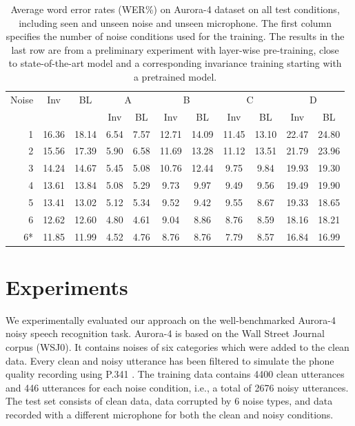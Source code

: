 \documentclass[a4paper]{article}
\begin{document}
\begin{table}[t]
    \centering
    \caption{Average word error rates (WER\%) on Aurora-4 dataset on all test conditions,
        including seen and unseen noise and unseen microphone. The first column
        specifies the number of noise conditions used for the training. The
        results in the last row are from a preliminary experiment with
        layer-wise pre-training, close to state-of-the-art
        model and a corresponding invariance training starting with a pretrained model.}
    \label{tab:results}
    \begin{tabular}{r|cc||cc|cc|cc|cc}
        Noise       &Inv&BL&  \multicolumn{2}{c|}{A} & \multicolumn{2}{c|}{B} & \multicolumn{2}{c|}{C} & \multicolumn{2}{c}{D}\\
               & & &  Inv & BL & Inv & BL & Inv & BL & Inv & BL\\
    \hline
    1           &16.36        &18.14 &6.54&7.57    &12.71& 14.09   & 11.45&   13.10    & 22.47 &   24.80    \\
    2           &15.56        &17.39 &5.90&  6.58 &   11.69   &13.28   &11.12   &13.51   &21.79   &23.96 \\
    3           &14.24        &14.67 &5.45 & 5.08&    10.76&   12.44&   9.75&    9.84 &   19.93&   19.30\\
    4           &13.61        &13.84 & 5.08 &5.29    &9.73    &9.97    &9.49    &9.56    &19.49   &19.90\\         
    5           &13.41        &13.02 & 5.12 &5.34    &9.52    &9.42    &9.55    &8.67    &19.33   &18.65\\         
    6           &12.62        &12.60 & 4.80 &4.61    &9.04    &8.86    &8.76    &8.59    &18.16   &18.21\\
    \hline\hline
    6* &11.85        &11.99    &4.52    &4.76    &8.76    &8.76    &7.79    &8.57    &16.84&    16.99
    \end{tabular}
\end{table}

\section{Experiments}
\label{sec:experiments}
We experimentally evaluated our approach   
on the well-benchmarked Aurora-4 \citep{parihar2002aurora} noisy speech recognition task. Aurora-4
is based on the Wall Street Journal corpus (WSJ0). It contains noises of 
six categories which were added to the clean data. Every clean and noisy
utterance has been 
filtered to simulate the phone quality recording using P.341 \citep{pariharsignal}. The training
data contains 4400 clean utterances and 446 utterances for each noise condition,
i.e., a total of 2676 noisy utterances.
The test set consists of clean data, data corrupted by 6 noise types, and data 
recorded with a different microphone for both the clean and noisy conditions.
\end{document}
